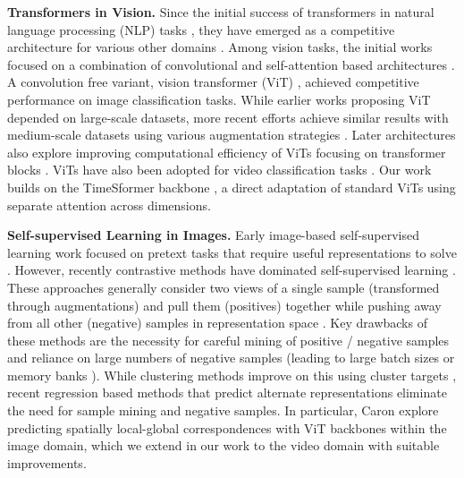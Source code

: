 \documentclass[10pt,twocolumn,letterpaper]{article}
\begin{document}
 
\textbf{Transformers in Vision.}
Since the initial success of transformers in natural language processing (NLP) tasks \cite{vaswani2017attention, devlin2018bert}, they have emerged as a competitive architecture for various other domains \cite{khan2021transformers}. Among vision tasks, the initial works focused on a combination of convolutional and self-attention based architectures \cite{carion2020end, wang2018non, wang2020end, zhang2020dynamic}. A convolution free variant, vision transformer (ViT) \cite{dosovitskiy2020image}, achieved competitive performance on image classification tasks. While earlier works proposing ViT \cite{dosovitskiy2020image} depended on large-scale datasets, more recent efforts achieve similar results with medium-scale datasets using various augmentation strategies \cite{pmlr-v139-touvron21a, Steiner2021HowTT}. Later architectures also explore improving computational efficiency of ViTs focusing on transformer blocks \cite{liu2021swin, Ryoo2021TokenLearnerWC}. ViTs have also been adopted for video classification tasks \cite{gberta_2021_ICML, sharir2021image, arnab2021vivit, fan2021multiscale, Ryoo2021TokenLearnerWC}. Our work builds on the TimeSformer backbone \cite{gberta_2021_ICML}, a direct adaptation of standard ViTs using separate attention across dimensions.

\textbf{Self-supervised Learning in Images.}
Early image-based self-supervised learning work focused on pretext tasks that require useful representations to solve \cite{komodakis2018unsupervised, pathak2016context, vincent2008extracting, noroozi2016unsupervised, doersch2015unsupervised, doersch2017multi, zhang2016colorful}. However, recently contrastive methods have dominated self-supervised learning \cite{caron2021emerging, chen2020simple, chen2020improved, he2020momentum, chen2021empirical, AMDIM, dosovitskiy2014discriminative, henaff2019data, le2020contrastive, PIRL, tian2019contrastive, tian2020makes} . These approaches generally consider two views of a single sample (transformed through augmentations) and pull them (positives) together while pushing away from all other (negative) samples in representation space \cite{AMDIM, oord2018representation}. Key drawbacks of these methods are the necessity for careful mining of positive / negative samples \cite{tian2020makes} and reliance on large numbers of negative samples (leading to large batch sizes \cite{chen2020simple} or memory banks \cite{he2020momentum}).  While clustering methods improve on this using cluster targets \cite{xie2016unsupervised, tian2017deepcluster, bautista2016cliquecnn, caron2018DeepCF, caron2020unsupervised, alwassel2019self, asano2020selflabelling, huang2019unsupervised}, recent regression based methods that predict alternate representations \cite{grill2020bootstrap, caron2021emerging} eliminate the need for sample mining and negative samples. In particular, Caron \etal \cite{caron2021emerging} explore predicting spatially local-global correspondences with ViT backbones within the image domain, which we extend in our work to the video domain with suitable improvements. 
\end{document}
